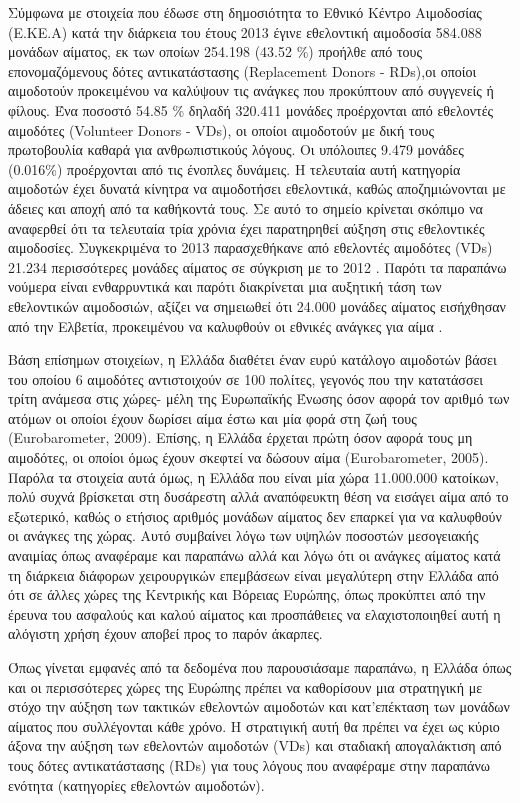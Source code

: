 		Σύμφωνα με στοιχεία που έδωσε στη δημοσιότητα το Εθνικό Κέντρο Αιμοδοσίας (Ε.ΚΕ.Α) κατά την διάρκεια του έτους 2013 έγινε εθελοντική αιμοδοσία 584.088 μονάδων αίματος, εκ των οποίων 254.198 (43.52 \%) προήλθε από τους επονομαζόμενους δότες αντικατάστασης (Replacement Donors - RDs),οι οποίοι αιμοδοτούν προκειμένου να καλύψουν τις ανάγκες που προκύπτουν από συγγενείς ή φίλους. Ένα ποσοστό 54.85 \% δηλαδή 320.411 μονάδες προέρχονται από εθελοντές αιμοδότες (Volunteer Donors - VDs), οι οποίοι αιμοδοτούν με δική τους πρωτοβουλία καθαρά για ανθρωπιστικούς λόγους. Οι υπόλοιπες 9.479 μονάδες (0.016\%) προέρχονται από τις ένοπλες δυνάμεις. Η τελευταία αυτή κατηγορία αιμοδοτών έχει δυνατά κίνητρα να αιμοδοτήσει εθελοντικά, καθώς αποζημιώνονται με άδειες και αποχή από τα καθήκοντά τους. Σε αυτό το σημείο κρίνεται σκόπιμο να αναφερθεί ότι τα τελευταία τρία χρόνια έχει παρατηρηθεί αύξηση στις εθελοντικές αιμοδοσίες. Συγκεκριμένα το 2013 παρασχεθήκανε από εθελοντές αιμοδότες (VDs) 21.234 περισσότερες μονάδες αίματος σε σύγκριση με το 2012 \cite{EKEA}. Παρότι τα παραπάνω νούμερα είναι ενθαρρυντικά και παρότι διακρίνεται μια αυξητική τάση των εθελοντικών αιμοδοσιών, αξίζει να σημειωθεί ότι 24.000 μονάδες αίματος εισήχθησαν από την Ελβετία, προκειμένου να καλυφθούν οι εθνικές ανάγκες για αίμα \cite{Marantidou2007}.
		
		Βάση επίσημων στοιχείων, η Ελλάδα διαθέτει έναν ευρύ κατάλογο αιμοδοτών βάσει του οποίου 6 αιμοδότες αντιστοιχούν σε 100 πολίτες, γεγονός που την κατατάσσει τρίτη ανάμεσα στις χώρες- μέλη της Ευρωπαϊκής Ένωσης όσον αφορά τον αριθμό των ατόμων οι οποίοι έχουν δωρίσει αίμα έστω και μία φορά στη ζωή τους  (Eurobarometer, 2009).  Επίσης, η Ελλάδα έρχεται πρώτη όσον αφορά τους μη αιμοδότες, οι οποίοι όμως έχουν σκεφτεί να δώσουν αίμα (Eurobarometer, 2005). Παρόλα τα στοιχεία αυτά όμως, η Ελλάδα που είναι μία χώρα 11.000.000 κατοίκων, πολύ συχνά βρίσκεται στη δυσάρεστη αλλά αναπόφευκτη θέση να εισάγει αίμα από το εξωτερικό, καθώς ο ετήσιος αριθμός μονάδων αίματος δεν επαρκεί για να καλυφθούν οι ανάγκες της χώρας. Αυτό συμβαίνει λόγω των υψηλών ποσοστών μεσογειακής αναιμίας όπως αναφέραμε και παραπάνω αλλά και λόγω ότι οι ανάγκες αίματος κατά τη διάρκεια διάφορων χειρουργικών επεμβάσεων είναι μεγαλύτερη στην Ελλάδα από ότι σε άλλες χώρες της Κεντρικής και Βόρειας Ευρώπης, όπως προκύπτει από την έρευνα του ασφαλούς και
καλού αίματος \cite{Grindon1996} και προσπάθειες να ελαχιστοποιηθεί αυτή η αλόγιστη χρήση έχουν αποβεί προς το παρόν άκαρπες. 

Όπως γίνεται εμφανές από τα δεδομένα που παρουσιάσαμε παραπάνω, η Ελλάδα όπως και οι περισσότερες χώρες της Ευρώπης πρέπει να καθορίσουν μια στρατηγική με στόχο την αύξηση των τακτικών εθελοντών αιμοδοτών και κατ'επέκταση των μονάδων αίματος που συλλέγονται κάθε χρόνο. Η στρατιγική αυτή θα πρέπει να έχει ως κύριο άξονα την αύξηση των εθελοντών αιμοδοτών (VDs) και σταδιακή απογαλάκτιση από τους δότες αντικατάστασης (RDs) για τους λόγους που αναφέραμε στην παραπάνω ενότητα (κατηγορίες εθελοντών αιμοδοτών).


